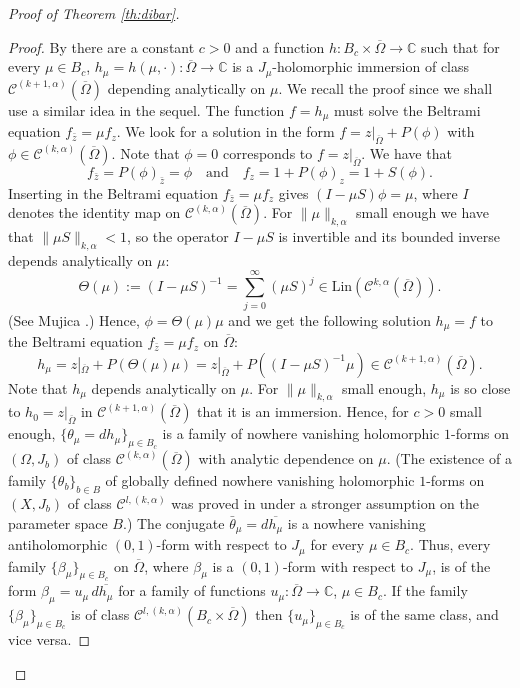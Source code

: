\documentclass[10pt,a4paper]{amsart}
\newcommand\C{\mathbb{C}}
\newcommand\Cscr{\mathscr{C}}
\begin{document}
\begin{proof}[Proof of Theorem \ref{th:dibar}]
\begin{proof}
By \cite[Theorem 4.1]{Forstneric2024Runge} there are a constant 
$c>0$ and a function $h:B_c \times \overline \Omega\to \C$ such that
for every $\mu\in B_c$, $h_\mu=h(\mu,\cdotp):\overline \Omega\to\C$ 
is a $J_\mu$-holomorphic immersion of class 
$\Cscr^{(k+1,\alpha)}(\overline \Omega)$ depending analytically on $\mu$.
We recall the proof since we shall use a similar idea 
in the sequel. The function $f=h_\mu$ must solve 
the Beltrami equation $f_{\bar z} = \mu f_z$.
We look for a solution in the form $f=z|_{\overline \Omega} +P(\phi)$ with
$\phi\in \Cscr^{(k,\alpha)}(\overline \Omega)$.
Note that $\phi=0$ corresponds to $f=z|_{\overline\Omega}$. 
We have that 
\[
	f_{\bar z}= P(\phi)_{\bar z}  = \phi
	\quad \text{and} \quad 
	f_z = 1 + P(\phi)_z = 1+ S(\phi).
\]
Inserting in the Beltrami equation $f_{\bar z} = \mu f_z$ gives $(I - \mu S) \phi =\mu$,
where $I$ denotes the identity map on $\Cscr^{(k,\alpha)}(\overline\Omega)$. 
For $\|\mu\|_{k,\alpha}$ small enough we have that $\|\mu S\|_{k,\alpha}<1$, 
so the operator $I- \mu S$ is invertible and its bounded inverse  
depends analytically on $\mu$: 
\[ 
	\Theta(\mu) := (I - \mu S)^{-1} =
	\sum_{j=0}^\infty (\mu S)^j 
	\in  \mathrm{Lin}(\Cscr^{k,\alpha}(\overline\Omega)). 
\] 
(See Mujica \cite[29.3 Theorem]{Mujica1986}.)
Hence, $\phi=\Theta(\mu)\mu$ and we get 
the following solution $h_\mu=f$ to the 
Beltrami equation $f_{\bar z} = \mu f_z$ on $\overline\Omega$:
\[ 
	h_\mu = z|_{\overline\Omega} +  P (\Theta(\mu) \mu) 
	= z|_{\overline\Omega} + P((I - \mu S)^{-1} \mu)
	 \in \Cscr^{(k+1,\alpha)}(\overline\Omega).
\] 
Note that $h_\mu$ depends analytically on $\mu$. For $\|\mu\|_{k,\alpha}$ 
small enough, $h_\mu$ is so close to $h_0=z|_{\overline\Omega}$ in
$\Cscr^{(k+1,\alpha)}(\overline\Omega)$ that it is an immersion.
Hence, for $c>0$ small enough, 
$\{\theta_\mu=dh_\mu\}_{\mu\in B_c}$
is a family of nowhere vanishing holomorphic 
$1$-forms on $(\Omega,J_b)$ of class 
$\Cscr^{(k,\alpha)}(\overline\Omega)$ with analytic dependence on $\mu$. 
(The existence of a family $\{\theta_b\}_{b\in B}$ of globally defined nowhere vanishing holomorphic $1$-forms on $(X,J_b)$ of class $\Cscr^{l,(k,\alpha)}$ was proved in \cite[Theorem 7.1]{Forstneric2024Runge} under a stronger assumption on the parameter space $B$.) 
%
The conjugate $\bar \theta_\mu=d\overline{h_\mu}$ is a nowhere vanishing 
antiholomorphic $(0,1)$-form with respect to $J_\mu$ for every 
$\mu\in B_c$. Thus, every family $\{\beta_\mu\}_{\mu\in B_c}$ 
on $\overline\Omega$, where $\beta_\mu$ is a $(0,1)$-form 
with respect to $J_\mu$, is of the form 
$\beta_\mu=u_{\mu}\, d\overline{h_\mu}$ for a family of functions 
$u_\mu: \overline\Omega\to \C$, $\mu\in B_c$. If the family 
$\{\beta_\mu\}_{\mu\in B_c}$ is of class 
$\Cscr^{l,(k,\alpha)}(B_c\times\overline\Omega)$
then $\{u_\mu\}_{\mu\in B_c}$ is of the same class, and vice versa.


\end{proof}
\end{proof}
\end{document}
